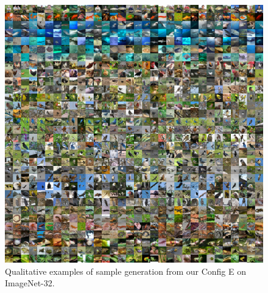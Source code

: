 {
\begin{figure}[ht!]
    \setlength{\imgsize}{0.2\linewidth} %
    
    \setlength{\tabcolsep}{0pt} %
    \renewcommand{\arraystretch}{0} %

    \newcommand{\qualitativeimg}[1]{%
        \texttt{[image: figures/qualitative/stacked-mnist-000008806/number-\#1.jpg]}%
    }
    \centering
    
    \includegraphics[width=\linewidth]{figures/qualitative/imgnet-32-000681275.jpg}
    \caption{Qualitative examples of sample generation from our Config E on ImageNet-32.}
    \label{fig:imgnet-32}
\end{figure}
}